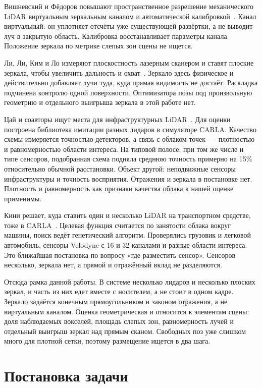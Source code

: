 \documentclass{misisarticle}
\begin{document}
Вишневский и Фёдоров повышают пространственное разрешение механического LiDAR виртуальным зеркальным каналом и автоматической калибровкой~\cite{vishnevsky2026}. Канал виртуальный: он уплотняет отсчёты уже существующей развёртки, а не выводит луч в закрытую область. Калибровка восстанавливает параметры канала. Положение зеркала по метрике слепых зон сцены не ищется.

Ли, Ли, Ким и Ло измеряют плоскостность лазерным сканером и ставят плоские зеркала, чтобы увеличить дальность и охват~\cite{li2021}. Зеркало здесь физическое и действительно добавляет лучи туда, куда прямая видимость не достаёт. Раскладка подчинена контролю одной поверхности. Оптимизатора позы под произвольную геометрию и отдельного выигрыша зеркала в этой работе нет.

Цай и соавторы ищут места для инфраструктурных LiDAR~\cite{cai2023}. Для оценки построена библиотека имитации разных лидаров в симуляторе CARLA. Качество схемы измеряется точностью детекторов, а связь с облаком точек~--- плотностью и равномерностью области интереса. На типовой полосе, при том же числе и типе сенсоров, подобранная схема подняла среднюю точность примерно на 15\% относительно обычной расстановки. Объект другой: неподвижные сенсоры инфраструктуры и точность восприятия. Отражения и зеркала в постановке нет. Плотность и равномерность как признаки качества облака к нашей оценке применимы.

Кини решает, куда ставить один и несколько LiDAR на транспортном средстве, тоже в CARLA~\cite{kini2020}. Целевая функция считается по занятости облака вокруг машины, поиск ведёт генетический алгоритм. Проверялись грузовик и легковой автомобиль, сенсоры Velodyne с 16 и 32 каналами и разные области интереса. Это ближайшая постановка по вопросу «где разместить сенсор». Сенсоров несколько, зеркала нет, а прямой и отражённый вклад не разделяются.

Отсюда рамка данной работы. В системе несколько лидаров и несколько плоских зеркал, и часть из них едет вместе с носителем, а не стоит в одном кадре. Зеркало задаётся конечным прямоугольником и законом отражения, а не виртуальным каналом. Оценка геометрическая и относится к элементам сцены: доля наблюдаемых вокселей, площадь слепых зон, равномерность лучей и отдельный выигрыш зеркал над прямым сканом. Свободных поз уже слишком много для плотной сетки, поэтому размещение ищется в два шага.

\section{Постановка задачи}
\end{document}
